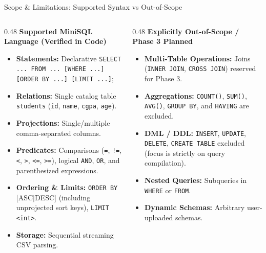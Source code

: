 \documentclass[aspectratio=169,10pt]{beamer}
\begin{document}
\begin{frame}{Scope \& Limitations: Supported Syntax vs Out-of-Scope}
    \begin{columns}[T]
        \begin{column}{0.48\textwidth}
            \textbf{Supported MiniSQL Language (Verified in Code)}
            \begin{itemize}\footnotesize
                \item \textbf{Statements:} Declarative \texttt{SELECT ... FROM ... [WHERE ...] [ORDER BY ...] [LIMIT ...]};
                \item \textbf{Relations:} Single catalog table \texttt{students} (\texttt{id}, \texttt{name}, \texttt{cgpa}, \texttt{age}).
                \item \textbf{Projections:} Single/multiple comma-separated columns.
                \item \textbf{Predicates:} Comparisons (\texttt{=}, \texttt{!=}, \texttt{<}, \texttt{>}, \texttt{<=}, \texttt{>=}), logical \texttt{AND}, \texttt{OR}, and parenthesized expressions.
                \item \textbf{Ordering \& Limits:} \texttt{ORDER BY} [ASC$|$DESC] (including unprojected sort keys), \texttt{LIMIT <int>}.
                \item \textbf{Storage:} Sequential streaming CSV parsing.
            \end{itemize}
        \end{column}
        \begin{column}{0.48\textwidth}
            \textbf{Explicitly Out-of-Scope / Phase 3 Planned}
            \begin{itemize}\footnotesize
                \item \textbf{Multi-Table Operations:} Joins (\texttt{INNER JOIN}, \texttt{CROSS JOIN}) reserved for Phase 3.
                \item \textbf{Aggregations:} \texttt{COUNT()}, \texttt{SUM()}, \texttt{AVG()}, \texttt{GROUP BY}, and \texttt{HAVING} are excluded.
                \item \textbf{DML / DDL:} \texttt{INSERT}, \texttt{UPDATE}, \texttt{DELETE}, \texttt{CREATE TABLE} excluded (focus is strictly on query compilation).
                \item \textbf{Nested Queries:} Subqueries in \texttt{WHERE} or \texttt{FROM}.
                \item \textbf{Dynamic Schemas:} Arbitrary user-uploaded schemas.
            \end{itemize}
        \end{column}
    \end{columns}
\end{frame}
\end{document}
